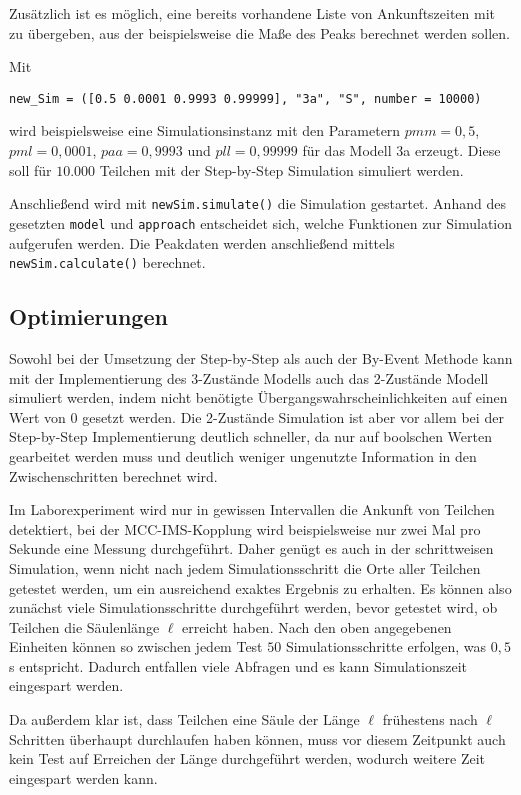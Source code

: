Zusätzlich ist es möglich, eine bereits vorhandene Liste von Ankunftszeiten mit zu übergeben, aus der beispielsweise die Maße des Peaks berechnet werden sollen.

Mit \begin{verbatim}
new_Sim = ([0.5 0.0001 0.9993 0.99999], "3a", "S", number = 10000)
\end{verbatim} 
wird beispielsweise eine Simulationsinstanz mit den Parametern $pmm = 0,5$, $pml = 0,0001$, $paa = 0,9993$ und $pll = 0,99999$ für das Modell 3a erzeugt. Diese soll für $10.000$ Teilchen mit der Step-by-Step Simulation simuliert werden.

Anschließend wird mit \verb!newSim.simulate()! die Simulation gestartet. Anhand des gesetzten \verb!model! und \verb!approach! entscheidet sich, welche Funktionen zur Simulation aufgerufen werden. Die Peakdaten werden anschließend mittels \verb!newSim.calculate()! berechnet.


\subsection{Optimierungen}
Sowohl bei der Umsetzung der Step-by-Step als auch der By-Event Methode kann mit der Implementierung des 3-Zustände Modells auch das 2-Zustände Modell simuliert werden, indem nicht benötigte Übergangswahrscheinlichkeiten auf einen Wert von $0$ gesetzt werden. Die 2-Zustände Simulation ist aber vor allem bei der Step-by-Step Implementierung deutlich schneller, da nur auf boolschen Werten gearbeitet werden muss und deutlich weniger ungenutzte Information in den Zwischenschritten berechnet wird.

Im Laborexperiment wird nur in gewissen Intervallen die Ankunft von Teilchen detektiert, bei der MCC-IMS-Kopplung wird beispielsweise nur zwei Mal pro Sekunde eine Messung durchgeführt. Daher genügt es auch in der schrittweisen Simulation, wenn nicht nach jedem Simulationsschritt die Orte aller Teilchen getestet werden, um ein ausreichend exaktes Ergebnis zu erhalten.
Es können also zunächst viele Simulationsschritte durchgeführt werden, bevor getestet wird, ob Teilchen die Säulenlänge $\ell$ erreicht haben. Nach den oben angegebenen Einheiten können so zwischen jedem Test $50$ Simulationsschritte erfolgen, was $0,5$ s entspricht. Dadurch entfallen viele Abfragen und es kann Simulationszeit eingespart werden. 

Da außerdem klar ist, dass Teilchen eine Säule der Länge $\ell$ frühestens nach $\ell$ Schritten überhaupt durchlaufen haben können, muss vor diesem Zeitpunkt auch kein Test auf Erreichen der Länge durchgeführt werden, wodurch weitere Zeit eingespart werden kann.


